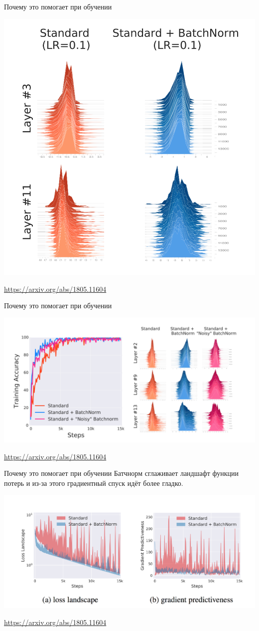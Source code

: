 \documentclass[notes,12pt, aspectratio=169]{beamer}
\begin{document}
\begin{frame}{Почему это помогает при обучении}
\begin{center}
	\includegraphics[width=.45\linewidth]{how_bn_help_2.png}
\end{center}
\vfill
\footnotesize
{\color{blue} \url{https://arxiv.org/abs/1805.11604}}
\end{frame}

\begin{frame}{Почему это помогает при обучении}
\begin{center}
	\includegraphics[width=.9\linewidth]{how_bn_help_3.png}
\end{center}
\vfill
\footnotesize
{\color{blue} \url{https://arxiv.org/abs/1805.11604}}
\end{frame}

\begin{frame}{Почему это помогает при обучении}
\alert{Батчнорм сглаживает ландшафт функции потерь и из-за этого градиентный спуск идёт более гладко.}
\begin{center}
	\includegraphics[width=.8\linewidth]{how_bn_help_4.png}
\end{center}
\vfill
\footnotesize
{\color{blue} \url{https://arxiv.org/abs/1805.11604}}
\end{frame}
\end{document}
